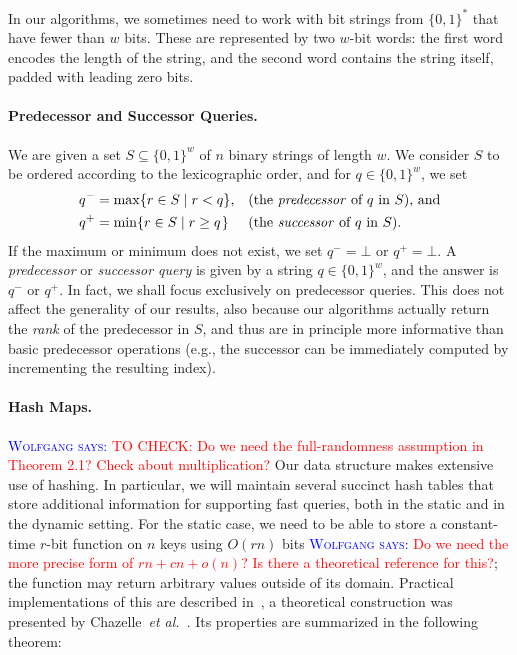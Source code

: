 \documentclass[a4paper,11pt]{article}
\newcommand{\etal}{\emph{et al.}\xspace}
\newcommand{\?}{\mskip1.5mu}
\newcommand{\aremark}[3]{\textcolor{blue}{\textsc{#1 #2:}}
  \textcolor{red}{\textsf{#3}}}
\newcommand{\wolfgang}[2][says]{\aremark{Wolfgang}{#1}{#2}}
\begin{document}
In our algorithms, we sometimes need to work with
bit strings from $\{0, 1\}^*$ that have fewer than $w$ bits. 
These are represented by
two $w$-bit words: the first word encodes the length of the string, 
and the second word contains the string itself, padded with leading
zero bits.

\paragraph{Predecessor and Successor Queries.}
We are given a set $S \subseteq \{0, 1\}^w$ of $n$ binary strings of 
length $w$. We consider $S$ to be ordered according to the 
lexicographic order, and for $q \in \{0, 1\}^w$, we set
\begin{align*}
     q^- &= \max \{r \in S \mid r < q\},  && 
        \text{(the \emph{predecessor} of $q$ in $S$), and} \\
     q^+ &= \min \{r \in S \mid r \geq q\?\} && 
       \text{(the \emph{successor} of $q$ in $S$)}.
\end{align*}
If the maximum or minimum does not exist, we set $q^- = \bot$ or 
$q^+ = \bot$.  A \emph{predecessor} or \emph{successor query} is
given by a string $q \in \{0, 1\}^w$, and the answer is $q^-$ or 
$q^+$. In fact, we shall focus exclusively on predecessor queries. 
This does not affect the generality of our results,
also because our algorithms actually return the \emph{rank} of the 
predecessor in $S$, and thus are in principle more informative 
than basic predecessor operations
(e.g., the successor can be immediately computed by incrementing 
the resulting index).

\paragraph{Hash Maps.}
\wolfgang{TO CHECK: Do we need the full-randomness assumption in 
Theorem 2.1? Check about multiplication?}
Our data structure makes extensive use of
hashing. In particular, we will maintain several
succinct hash tables that store additional
information for supporting fast queries, both
in the static and in the dynamic setting.
For the static case,
we need to be able to store a constant-time $r$-bit function on 
$n$ keys using $O(rn)$ bits \wolfgang{Do we need the more
precise form of $rn + cn + o(n)$? Is there a theoretical
reference for this?}; the 
function may return arbitrary values outside of its domain. 
Practical implementations of this are described
in~\cite{BelazzouguiBoPaVi11}, a theoretical
construction was presented by
Chazelle~\etal~\cite{ChazelleKiRuTa04}. Its
properties are summarized in the following theorem:
\end{document}
